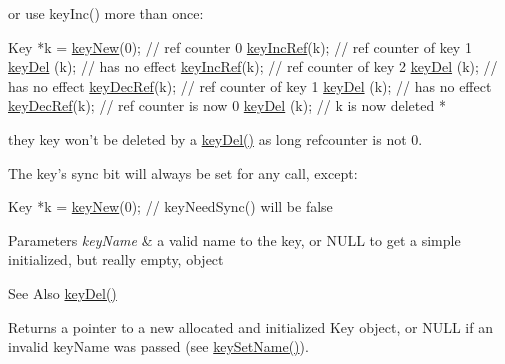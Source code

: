 or use key\-Inc() more than once\-:


\begin{DoxyCode}
Key *k = \hyperlink{group__key_gaf6893c038b3ebee90c73a9ea8356bebf}{keyNew}(0); \textcolor{comment}{// ref counter 0}
\hyperlink{group__key_ga6970a6f254d67af7e39f8e469bb162f1}{keyIncRef}(k); \textcolor{comment}{// ref counter of key 1}
\hyperlink{group__key_ga3df95bbc2494e3e6703ece5639be5bb1}{keyDel} (k);   \textcolor{comment}{// has no effect}
\hyperlink{group__key_ga6970a6f254d67af7e39f8e469bb162f1}{keyIncRef}(k); \textcolor{comment}{// ref counter of key 2}
\hyperlink{group__key_ga3df95bbc2494e3e6703ece5639be5bb1}{keyDel} (k);   \textcolor{comment}{// has no effect}
\hyperlink{group__key_ga2c6433ca22109e4e141946057eccb283}{keyDecRef}(k); \textcolor{comment}{// ref counter of key 1}
\hyperlink{group__key_ga3df95bbc2494e3e6703ece5639be5bb1}{keyDel} (k);   \textcolor{comment}{// has no effect}
\hyperlink{group__key_ga2c6433ca22109e4e141946057eccb283}{keyDecRef}(k); \textcolor{comment}{// ref counter is now 0}
\hyperlink{group__key_ga3df95bbc2494e3e6703ece5639be5bb1}{keyDel} (k); \textcolor{comment}{// k is now deleted}
 *
\end{DoxyCode}


they key won't be deleted by a \hyperlink{group__key_ga3df95bbc2494e3e6703ece5639be5bb1}{key\-Del()} as long refcounter is not 0.

The key's sync bit will always be set for any call, except\-: 
\begin{DoxyCode}
Key *k = \hyperlink{group__key_gaf6893c038b3ebee90c73a9ea8356bebf}{keyNew}(0);
\textcolor{comment}{// keyNeedSync() will be false}
\end{DoxyCode}



\begin{DoxyParams}{Parameters}
{\em key\-Name} & a valid name to the key, or N\-U\-L\-L to get a simple initialized, but really empty, object \\
\hline
\end{DoxyParams}
\begin{DoxySeeAlso}{See Also}
\hyperlink{group__key_ga3df95bbc2494e3e6703ece5639be5bb1}{key\-Del()} 
\end{DoxySeeAlso}
\begin{DoxyReturn}{Returns}
a pointer to a new allocated and initialized Key object, or N\-U\-L\-L if an invalid {\ttfamily key\-Name} was passed (see \hyperlink{group__keyname_ga7699091610e7f3f43d2949514a4b35d9}{key\-Set\-Name()}). 
\end{DoxyReturn}
